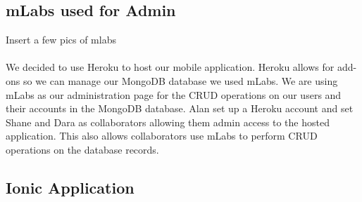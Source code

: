 \subsection{mLabs used for Admin}
Insert a few pics of mlabs\paragraph{}
We decided to use Heroku to host our mobile application. Heroku allows for add-ons so we can manage our MongoDB database we used mLabs. We are using mLabs as our administration page for the CRUD operations on our users and their accounts in the MongoDB database. Alan set up a Heroku account and set Shane and Dara as collaborators allowing them admin access to the hosted application. This also allows collaborators use mLabs to perform CRUD operations on the database records. 


\subsection{Ionic Application}

